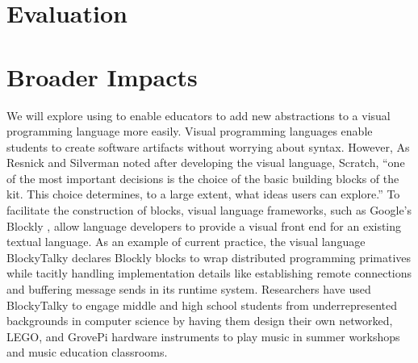 




\section{Evaluation}
\label{sec:eval}


\section{Broader Impacts}
\label{sec:impact}




We will explore using \rasps to enable educators to add new
abstractions to a visual programming language more easily. Visual programming
languages enable students to create software artifacts without
worrying about syntax.
However, As Resnick and Silverman noted after developing the visual language,
Scratch\cite{Scratch}, ``one of the most important
decisions is the choice of the basic building blocks of the
kit. This choice determines, to a large extent, what ideas
users can explore.'' 
To facilitate the construction of blocks,
visual language frameworks, such
as Google's Blockly \cite{Blocks,BlocklyApps}, allow language
developers to
provide a visual front end for an existing textual language.
As an example of current practice, the visual
language BlockyTalky\cite{BlockyTalky} declares Blockly blocks to wrap distributed
programming primatives while tacitly handling implementation details like establishing
remote connections and buffering message sends in its runtime system.
Researchers have used BlockyTalky to engage middle and high school students
from underrepresented backgrounds in computer science by having them
design their own networked, LEGO, and GrovePi hardware instruments to play music
in summer workshops and music education classrooms.

